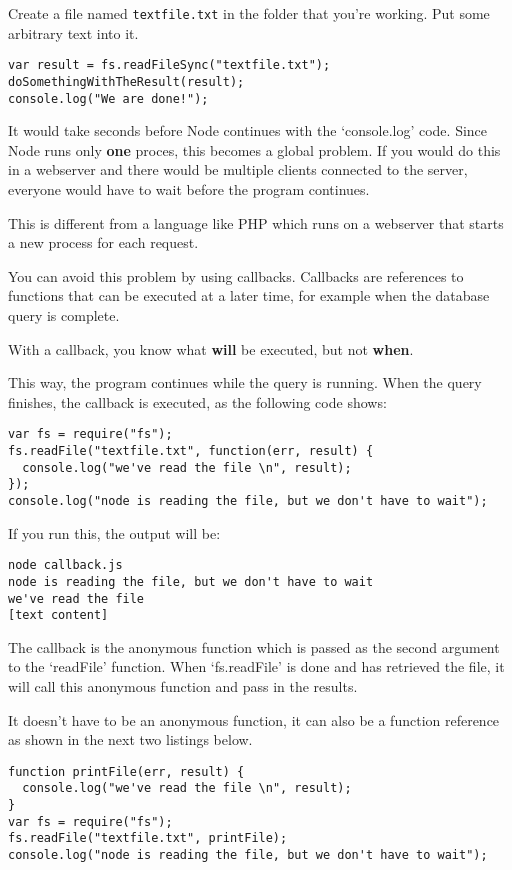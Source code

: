 \documentclass[a4paper]{report}
\begin{document}
Create a file named \texttt{textfile.txt} in the folder that you're working. Put some arbitrary text into it.

\begin{lstlisting} 
var result = fs.readFileSync("textfile.txt");
doSomethingWithTheResult(result); 
console.log("We are done!"); 
\end{lstlisting}
\noindent It would take seconds before Node continues with the `console.log' code. Since Node runs only \textbf{one} proces, this becomes a global problem. If you would do this in a webserver and there would be multiple clients connected to the server, everyone would have to wait before the program continues.  
 
This is different from a language like PHP which runs on a webserver that starts a new process for each request. 
 
You can avoid this problem by using callbacks. Callbacks are references to functions that can be executed at a later time, for example when the database query is complete.  
 
With a callback, you know what \textbf{will} be executed, but not \textbf{when}. 
 
This way, the program continues while the query is running. When the query finishes, the callback is executed, as the following code shows: 
 
\begin{lstlisting} 
var fs = require("fs");
fs.readFile("textfile.txt", function(err, result) {
  console.log("we've read the file \n", result);
});
console.log("node is reading the file, but we don't have to wait");
\end{lstlisting} 

If you run this, the output will be: 
\begin{verbatim}
node callback.js
node is reading the file, but we don't have to wait
we've read the file
[text content]
\end{verbatim} 
 
 
\noindent The callback is the anonymous function which is passed as the second argument to the `readFile' function. When `fs.readFile' is done and has retrieved the file, it will call this anonymous function and pass in the results. 
 
It doesn't have to be an anonymous function, it can also be a function reference as shown in the next two listings below. 
 
\begin{lstlisting} 
function printFile(err, result) {
  console.log("we've read the file \n", result);
}
var fs = require("fs");
fs.readFile("textfile.txt", printFile);
console.log("node is reading the file, but we don't have to wait");
\end{lstlisting} 
 
\end{document}
